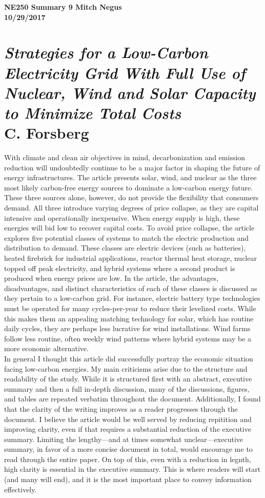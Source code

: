\documentclass{report}
\newcommand{\tab}{\-\hspace{1cm}}
\begin{document}
\thispagestyle{empty}

{\bf {\large {NE250 Summary {9} \hfill Mitch Negus\\
		\hspace*{\fill} 10/29/2017\\ }}}
\section*{\textsl{Strategies for a Low-Carbon Electricity Grid With Full Use of Nuclear, Wind and Solar Capacity to Minimize Total Costs} \\ \normalsize C. Forsberg}

\tab With climate and clean air objectives in mind, decarbonization and emission reduction will undoubtedly continue to be a major factor in shaping the future of energy infrastructures. The article presents solar, wind, and nuclear as the three most likely carbon-free energy sources to dominate a low-carbon energy future. These three sources alone, however, do not provide the flexibility that consumers demand. All three introduce varying degrees of price collapse, as they are capital intensive and operationally inexpensive. When energy supply is high, these energies will bid low to recover capital costs. To avoid price collapse, the article explores five potential classes of systems to match the electric production and distribution to demand. These classes are electric devices (such as batteries), heated firebrick for industrial applications, reactor thermal heat storage, nuclear topped off peak electricity, and hybrid systems where a second product is produced when energy prices are low. In the article, the advantages, disadvantages, and distinct characteristics of each of these classes is discussed as they pertain to a low-carbon grid. For instance, electric battery type technologies must be operated for many cycles-per-year to reduce their levelized costs. While this makes them an appealing matching technology for solar, which has routine daily cycles, they are perhaps less lucrative for wind installations. Wind farms follow less routine, often weekly wind patterns where hybrid systems may be a more economic alternative. \\
\tab In general I thought this article did successfully portray the economic situation facing low-carbon energies. My main criticisms arise due to the structure and readability of the study. While it is structured first with an abstract, executive summary and then a full in-depth discussion, many of the discussions, figures, and tables are repeated verbatim throughout the document. Additionally, I found that the clarity of the writing improves as a reader progresses through the document. I believe the article would be well served by reducing repitition and improving clarity, even if that requires a substantial reduction of the executive summary. Limiting the lengthy---and at times somewhat unclear---executive summary, in favor of a more concise document in total, would encourage me to read through the entire paper. On top of this, even with a reduction in legnth, high clarity is essential in the executive summary. This is where readers will start (and many will end), and it is the most important place to convey information effectively.
\end{document}
